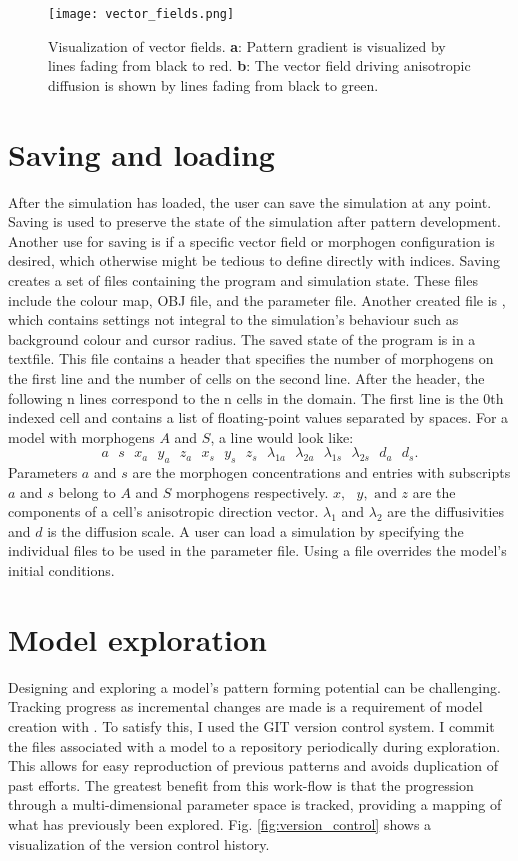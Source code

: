\begin{figure}[ht]
	\centering
	\texttt{[image: vector\_fields.png]}	
	\caption{Visualization of vector fields. \textbf{a}: Pattern gradient is visualized by lines fading from black to red. \textbf{b}: The vector field driving anisotropic diffusion is shown by lines fading from black to green.} 
	\label{fig:vector_fields}
\end{figure}

\section{Saving and loading}
After the simulation has loaded, the user can save the simulation at any point. Saving is used to preserve the state of the simulation after pattern development. Another use for saving is if a specific vector field or morphogen configuration is desired, which otherwise might be tedious to define directly with indices. Saving creates a set of files containing the program and simulation state. These files include the colour map, OBJ file, and the parameter file. Another created file is , which contains settings not integral to the simulation's behaviour such as background colour and cursor radius. The saved state of the program is in a  textfile. This file contains a header that specifies the number of morphogens on the first line and the number of cells on the second line. After the header, the following n lines correspond to the n cells in the domain. The first line is the 0th indexed cell and contains a list of floating-point values separated by spaces. For a model with morphogens $A$ and $S$, a line would look like:
\[a\text{ }s\text{ }x_a\text{ }y_a\text{ }z_a\text{ }x_s\text{ }y_s\text{ }z_s\text{ }\lambda_{1a}\text{ }\lambda_{2a}\text{ }\lambda_{1s}\text{ }\lambda_{2s}\text{ }d_a\text{ }d_s.\]
Parameters $a$ and $s$ are the morphogen concentrations and entries with subscripts $a$ and $s$ belong to $A$ and $S$ morphogens respectively. $x,\text{ }y, \text{ and } z$ are the components of a cell's anisotropic direction vector. $\lambda_1$ and $\lambda_2$ are the diffusivities and $d$ is the diffusion scale. A user can load a simulation by specifying the individual files to be used in the parameter file. Using a  file overrides the model's initial conditions.

\section{Model exploration}
Designing and exploring a model's pattern forming potential can be challenging. Tracking progress as incremental changes are made is a requirement of model creation with \ProgramName{}. To satisfy this, I used the GIT version control system. I commit the files associated with a model to a repository periodically during exploration. This allows for easy reproduction of previous patterns and avoids duplication of past efforts. The greatest benefit from this work-flow is that the progression through a multi-dimensional parameter space is tracked, providing a mapping of what has previously been explored. Fig. \ref{fig:version_control} shows a visualization of the version control history.

